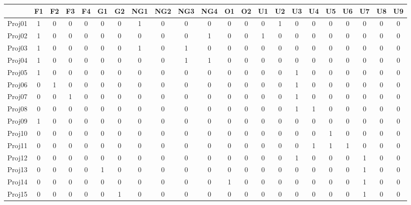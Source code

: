 \documentclass[8pt]{beamer}
\begin{document}
\begin{frame}[fragile]
\begin{columns}[c]
\begin{minipage}[c][.5\textheight][c]{\linewidth}
{\tiny
\setlength{\tabcolsep}{1pt}
\begin{table}
\begin{tabular}{c|ccccccccccccccccccccc}
\bottomrule
&	F1 & F2 & F3 & F4 & G1 & G2 & NG1 & NG2 & NG3 & NG4 & O1 & O2 & U1 & U2 & U3 & U4 & U5 & U6 & U7 & U8 & U9\\
\hline
Proj01 & 1  & 0  & 0  & 0  & 0  & 0   & 1   & 0   & 0   & 0  & 0  & 0  & 0  & 1  & 0  & 0  & 0  & 0  & 0  & 0  & 0 \\
Proj02 & 1  & 0  & 0  & 0  & 0  & 0   & 0   & 0   & 0   & 1  & 0  & 0  & 1  & 0  & 0  & 0  & 0  & 0  & 0  & 0  & 0 \\
Proj03 & 1  & 0  & 0  & 0  & 0  & 0   & 1   & 0   & 1   & 0  & 0  & 0  & 0  & 0  & 0  & 0  & 0  & 0  & 0  & 0  & 0 \\
Proj04 & 1  & 0  & 0  & 0  & 0  & 0   & 0   & 0   & 1   & 1  & 0  & 0  & 0  & 0  & 0  & 0  & 0  & 0  & 0  & 0  & 0 \\
Proj05 & 1  & 0  & 0  & 0  & 0  & 0   & 0   & 0   & 0   & 0  & 0  & 0  & 0  & 0  & 1  & 0  & 0  & 0  & 0  & 0  & 0 \\
Proj06 & 0  & 1  & 0  & 0  & 0  & 0   & 0   & 0   & 0   & 0  & 0  & 0  & 0  & 0  & 1  & 0  & 0  & 0  & 0  & 0  & 0 \\
Proj07 & 0  & 0  & 1  & 0  & 0  & 0   & 0   & 0   & 0   & 0  & 0  & 0  & 0  & 0  & 1  & 0  & 0  & 0  & 0  & 0  & 0 \\
Proj08 & 0  & 0  & 0  & 0  & 0  & 0   & 0   & 0   & 0   & 0  & 0  & 0  & 0  & 0  & 1  & 1  & 0  & 0  & 0  & 0  & 0 \\
Proj09 & 1  & 0  & 0  & 0  & 0  & 0   & 0   & 0   & 0   & 0  & 0  & 0  & 0  & 0  & 0  & 0  & 0  & 0  & 0  & 0  & 0 \\
Proj10 & 0  & 0  & 0  & 0  & 0  & 0   & 0   & 0   & 0   & 0  & 0  & 0  & 0  & 0  & 0  & 0  & 1  & 0  & 0  & 0  & 0 \\
Proj11 & 0  & 0  & 0  & 0  & 0  & 0   & 0   & 0   & 0   & 0  & 0  & 0  & 0  & 0  & 0  & 1  & 1  & 1  & 0  & 0  & 0 \\
Proj12 & 0  & 0  & 0  & 0  & 0  & 0   & 0   & 0   & 0   & 0  & 0  & 0  & 0  & 0  & 1  & 0  & 0  & 0  & 1  & 0  & 0 \\
Proj13 & 0  & 0  & 0  & 0  & 1  & 0   & 0   & 0   & 0   & 0  & 0  & 0  & 0  & 0  & 0  & 0  & 0  & 0  & 1  & 0  & 0 \\
Proj14 & 0  & 0  & 0  & 0  & 0  & 0   & 0   & 0   & 0   & 0  & 1  & 0  & 0  & 0  & 0  & 0  & 0  & 0  & 1  & 0  & 0 \\
Proj15 & 0  & 0  & 0  & 0  & 0  & 1   & 0   & 0   & 0   & 0  & 0  & 0  & 0  & 0  & 0  & 0  & 0  & 0  & 1  & 0  & 0 \\

\end{tabular}
\end{table}}
\end{minipage}
\end{columns}
\end{frame}
\end{document}
